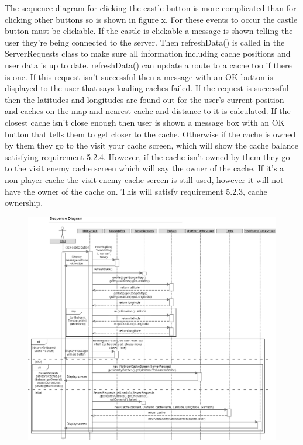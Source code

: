 \noindent
The sequence diagram for clicking the castle button is more complicated than for clicking other buttons so is shown in figure x. For these events to occur the castle button must be clickable. If the castle is clickable a message is shown telling the user they're being connected to the server. Then refreshData() is called in the ServerRequests class to make sure all information including cache positions and user data is up to date. refreshData() can update a route to a cache too if there is one. If this request isn't successful then a message with an OK button is displayed to the user that says loading caches failed. If the request is successful then the latitudes and longitudes are found out for the user's current position and caches on the map and nearest cache and distance to it is calculated. If the closest cache isn't close enough then user is shown a message box with an OK button that tells them to get closer to the cache. Otherwise if the cache is owned by them they go to the visit your cache screen, which will show the cache balance satisfying requirement 5.2.4. However, if the cache isn't owned by them they go to the visit enemy cache screen which will say the owner of the cache. If it's a non-player cache the visit enemy cache screen is still used, however it will not have the owner of the cache on. This will satisfy requirement 5.2.3, cache ownership.

\newpage
\begin{figure}
    \centering
    \includegraphics[width=\textwidth]{images/sequence/castleButton}
\end{figure}

